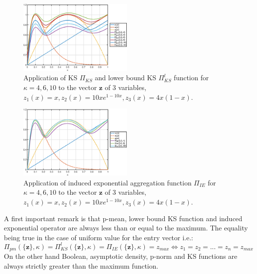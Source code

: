 \begin{figure}[!ht]
\centering
  \includegraphics[width=0.5\textwidth]{images/Ch3/KSbench.eps}
\caption{Application of KS $\Pi_{KS}$ and lower bound KS $\Pi_{KS}^l$ function for $\kappa=4,6,10$ to the vector $\mathbf{z}$ of 3 variables, $z_1(x)=x,z_2(x)=10xe^{1-10x},z_3(x)=4x(1-x)$.}
\label{fig:kb}       %
\end{figure}
\begin{figure}[!ht]
\centering
  \includegraphics[width=0.5\textwidth]{images/Ch3/iebench.eps}
\caption{Application of induced exponential aggregation function $\Pi_{IE}$ for $\kappa=4,6,10$ to the vector $\mathbf{z}$ of 3 variables,$z_1(x)=x,z_2(x)=10xe^{1-10x},z_3(x)=4x(1-x)$.}
\label{fig:ib}       %
\end{figure}
 A first important remark is that p-mean, lower bound KS function and induced exponential operator are always less than or equal to the maximum. The equality being true in the case of uniform value for the entry vector i.e.:
\begin{equation}
    \Pi_{pm}(\lbrace \mathbf{z}\rbrace,\kappa)=\Pi_{KS}^l(\lbrace \mathbf{z}\rbrace,\kappa)=\Pi_{IE}(\lbrace \mathbf{z}\rbrace,\kappa)=z_{max} \Leftrightarrow z_1=z_2=...=z_n=z_{max} 
\end{equation}
On the other hand Boolean, asymptotic density, p-norm and KS functions are always strictly greater than the maximum function.
